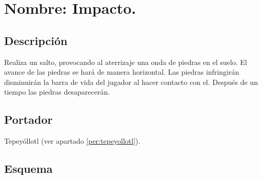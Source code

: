 \section{Nombre: Impacto.} \label{hab.impacto}
	\subsection{Descripción}
Realiza un salto, provocando al aterrizaje una onda de piedras en el suelo. El avance de las piedras se hará de manera horizontal. Las piedras infringirán disminuirán la barra de vida del jugador al hacer contacto con el. Después de un tiempo las piedras desaparecerán.
	\subsection{Portador}
Tepeyóllotl (ver apartado \ref{per:tepeyollotl}).
	\subsection{Esquema}